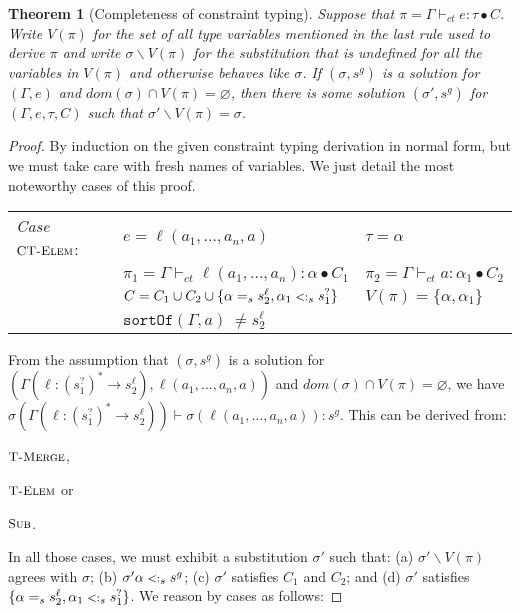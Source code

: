 \documentclass{eptcs}
\newcommand{\CC}{\ensuremath{C}\xspace}
\newcommand{\TElem}{{\small \textsc{T-Elem}}}
\newcommand{\TMerge}{{\small \textsc{T-Merge}}}
\newcommand{\Sub}{{\small \textsc{Sub}}}
\newcommand{\CTElem}{{\small \textsc{CT-Elem}}}
\newcommand{\sub}{\mathrel{\mbox{{\footnotesize $<:$}}}}
\newcommand{\ctvdash}{\ensuremath{\vdash_{ct}}}
\newcommand{\sortof}[2]{\texttt{sortOf}\ensuremath{(#1,#2)}}
\newcommand{\vsig}[2]{\ensuremath{{#1}^*\rightarrow{#2}}}
\newtheorem{thm}{Theorem}[section]
\begin{document}
\begin{thm}[Completeness of constraint typing]
\label{thm:completeness}
Suppose that $\pi = \Gamma \ctvdash e : \tau \bullet \CC$. Write $V(\pi)$ for
the set of all type variables mentioned in the last rule used to derive $\pi$
and write $\sigma \backslash V(\pi)$ for the substitution that is undefined for all the
variables in $V(\pi)$ and otherwise behaves like $\sigma$. If $(\sigma, s^g)$ is a
solution for $(\Gamma,e)$ and $dom(\sigma) \cap V(\pi) = \varnothing$, then
there is some solution $(\sigma',s^g)$ for
$(\Gamma,e,\tau,\CC)$ such that $\sigma' \backslash V(\pi) = \sigma$.
\end{thm}
\begin{proof}
By induction on the given constraint typing derivation in normal form, but we
must take care with fresh names of variables. We just detail the most noteworthy cases of this
proof.

\begin{flushleft}
\begin{tabular}{lll}
        \textit{Case} $\CTElem$:        & $e = \ell(a_1,\ldots,a_n,a)$
                                & $\tau = \alpha$                       \\
                                
                                & $\pi_1 = \Gamma \ctvdash \ell(a_1,\ldots,a_n) : \alpha
                                \bullet \CC_1$                  
                                & $\pi_2 = \Gamma \ctvdash a : \alpha_1 \bullet
                                \CC_2$                                  \\
                                
                                & $\CC = \CC_1 \cup \CC_2 \cup \{\alpha =_s
s_2^{\ell}, \alpha_1
                                \sub_s s_1^?\}$
                                & $V(\pi) = \{\alpha, \alpha_1\}$       \\
                                
                                & $\sortof{\Gamma}{a} ~\neq s_2^{\ell}$ & \\
\end{tabular}
\end{flushleft}

From the assumption that $(\sigma,s^g)$ is a solution for $(\Gamma(\ell :
\vsig{(s_1^?)}{s_2^{\ell}}), \ell(a_1,\ldots,a_n,a))$ and $dom(\sigma) \cap V(\pi) = \varnothing$, we have
$\sigma(\Gamma(\ell : \vsig{(s_1^?)}{s_2^{\ell}})) \vdash \sigma(\ell(a_1, \dots, a_n,
a)) : s^g$. This can be derived from: 
\begin{inparaenum}[1)] 
\item $\TMerge$,
\item $\TElem$ or
\item $\Sub$. 
\end{inparaenum}
In all those cases, we must exhibit a substitution $\sigma'$ such that: (a) $\sigma'
\backslash V(\pi)$ agrees with $\sigma$; (b) $\sigma'\alpha \sub_s s^g$; (c) $\sigma'$
satisfies $\CC_1$ and $\CC_2$; and (d) $\sigma'$ satisfies $\{\alpha =_s
s_2^{\ell},
\alpha_1 \sub_s s_1^?\}$. We reason by cases as follows:  


\end{proof}
\end{document}

